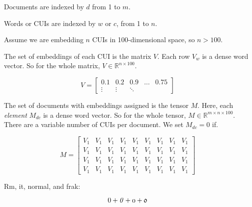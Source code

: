 \documentclass{article}
\begin{document}
Documents are indexed by $d$ from 1 to $m$.

Words or CUIs are indexed by $w$ or $c$, from 1 to $n$.

Assume we are embedding $n$ CUIs in 100-dimensional space, so $n > 100$.

The set of embeddings of each CUI is the matrix $V$. Each row $V_w$ is
a dense word vector. So for the whole matrix, $V \in \mathbb{R}^{n
  \times 100}$.

\begin{equation}
  V = \left[
      \begin{array}{ccccc}
        0.1 & 0.2 & 0.9 & \ldots & 0.75 \\
        \vdots & \vdots & \ddots
      \end{array} \right]
\end{equation}

The set of documents with embeddings assigned is the tensor $M$. Here,
each \emph{element} $M_{dc}$ is a dense word vector. So for the whole
tensor, $M \in \mathbb{R}^{m \times n \times 100}$. There are a
variable number of CUIs per document. We set $M_{dc} = 0$ if.

\begin{equation}
  M = \left[
      \begin{array}{ccccccccc}
        V_1 & V_1 & V_1 & V_1 & V_1 & V_1 & V_1 & V_1 & V_1 \\
        V_1 & V_1 & V_1 & V_1 & V_1 & V_1 & V_1 & V_1 & V_1 \\
        V_1 & V_1 & V_1 & V_1 & V_1 & V_1 & V_1 & V_1 & V_1 \\
        V_1 & V_1 & V_1 & V_1 & V_1 & V_1 & V_1 & V_1 & V_1
      \end{array} \right]
\end{equation}

Rm, it, normal, and frak:

\begin{equation}
  \mathrm{0} + \mathit{0} + \mathnormal{0} + \mathfrak{0}
\end{equation}
\end{document}

